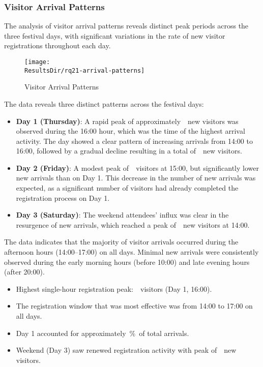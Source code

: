 
\subsubsection{Visitor Arrival Patterns}
\label{subsubsec:analysis-visitor-patterns}


The analysis of visitor arrival patterns reveals distinct peak periods across the three festival days, with significant variations in the rate of new visitor registrations throughout each day.

\begin{figure}[H]
	\centering
	\texttt{[image: \\ResultsDir/rq21-arrival-patterns]}
	\caption{Visitor Arrival Patterns}
	\label{fig:visitor-arrival-patterns}
	\source
\end{figure}

The data reveals three distinct patterns across the festival days:

\begin{itemize}
	\item \textbf{Day 1 (Thursday)}: A rapid peak of approximately~~new visitors was observed during the 16:00 hour, which was the time of the highest arrival activity.
	The day showed a clear pattern of increasing arrivals from 14:00 to 16:00, followed by a gradual decline resulting in a total of~~new visitors.
	\item \textbf{Day 2 (Friday)}: A modest peak of~~visitors at 15:00, but significantly lower new arrivals than on Day 1.
	This decrease in the number of new arrivals was expected, as a significant number of visitors had already completed the registration process on Day 1.
	\item \textbf{Day 3 (Saturday)}: The weekend attendees' influx was clear in the resurgence of new arrivals, which reached a peak of~~new visitors at 14:00.
\end{itemize}

The data indicates that the majority of visitor arrivals occurred during the afternoon hours (14:00–17:00) on all days.
Minimal new arrivals were consistently observed during the early morning hours (before 10:00) and late evening hours (after 20:00).

\begin{keytakeaways}
	\begin{itemize}
		\item Highest single-hour registration peak:~~visitors (Day 1, 16:00).
		\item The registration window that was most effective was from 14:00 to 17:00 on all days.
		\item Day 1 accounted for approximately~\%~of total arrivals.
		\item Weekend (Day 3) saw renewed registration activity with peak of~~new visitors.
	\end{itemize}
\end{keytakeaways}

